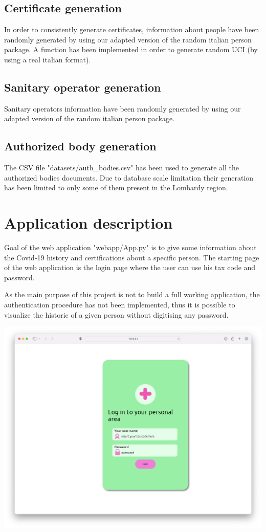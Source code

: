 \documentclass{article}
\begin{document}
\subsection{Certificate generation}
In order to consistently generate certificates, information about people have been randomly generated by using our adapted version of the random italian person package. A function has been implemented in order to generate random UCI (by using a real italian format).

\subsection{Sanitary operator generation}
Sanitary operators information have been randomly generated by using our adapted version of the random italian person package.

\subsection{Authorized body generation}
The CSV file {\selectfont"datasets/auth\_bodies.csv"} has been used to generate all the authorized bodies documents. Due to database scale limitation their generation has been limited to only some of them present in the Lombardy region.


\newpage
\section{Application description}
Goal of the web application {\selectfont"webapp/App.py"} is to give some information about the Covid-19 history and certifications about a specific person.
The starting page of the web application is the login page where the user can use his tax code
and password.

As the main purpose of this project is not to build a full working application, the authentication procedure has not been implemented, thus it is possible to visualize the historic of a given person without
digitising any password.
\hfill\break
\hfill\break

\begin{center}
\includegraphics[scale=0.23]{login.png}
\end{center}
\hfill\break
\hfill\break
\end{document}
